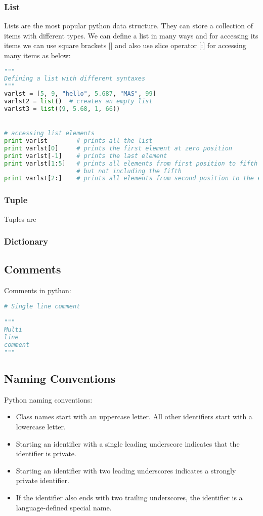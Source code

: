 \documentclass{article}
\begin{document}
\subsubsection{List}
Lists are the most popular python data structure. They can store a collection of items with different types. We can define a list in many ways and for accessing its items we can use square brackets [] and also use slice operator [:] for accessing many items as below:
\begin{lstlisting}[language = Python]
"""
Defining a list with different syntaxes
"""
varlst = [5, 9, "hello", 5.687, "MAS", 99]
varlst2 = list()  # creates an empty list
varlst3 = list((9, 5.68, 1, 66))


# accessing list elements
print varlst  		# prints all the list
print varlst[0]  	# prints the first element at zero position
print varlst[-1]  	# prints the last element
print varlst[1:5]  	# prints all elements from first position to fifth
					# but not including the fifth
print varlst[2:]  	# prints all elements from second position to the end
\end{lstlisting}

\subsubsection{Tuple}
Tuples are

\subsubsection{Dictionary}
\subsection{Comments}
Comments in python:
\begin{lstlisting}[language=python]
# Single line comment

"""
Multi
line
comment
"""
\end{lstlisting}

\subsection{Naming Conventions}
Python naming conventions:
\begin{itemize}
\item Class names start with an uppercase letter. All other identifiers start with a lowercase letter.
\item Starting an identifier with a single leading underscore indicates that the identifier is private.
\item Starting an identifier with two leading underscores indicates a strongly private identifier.
\item If the identifier also ends with two trailing underscores, the identifier is a language-defined special name.
\end{itemize}
\end{document}

